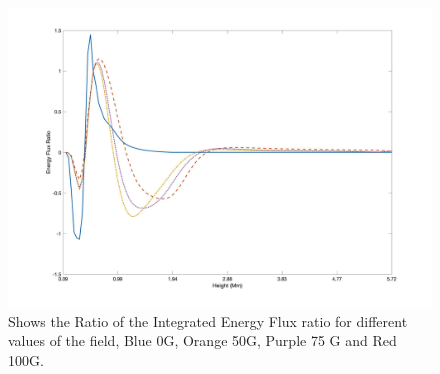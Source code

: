 \documentclass[linenumbers]{aastex63}
\begin{document}
\begin{figure}
    \label{energyfluxratio_50G_75G_100G_line}
    \centering
    \includegraphics[scale=0.08]{energyfluxratio.jpg}
    \caption{Shows the Ratio of the Integrated Energy Flux ratio for different values of the field, Blue 0G, Orange 50G, Purple 75 G and Red 100G.}
\end{figure}
\end{document}
